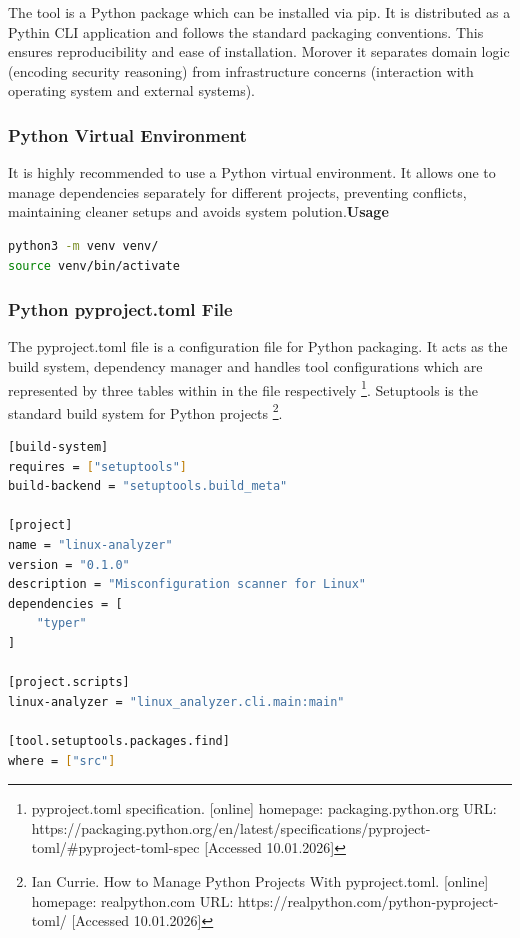 The tool is a Python package which can be installed via pip. It is distributed as a Pythin CLI application and follows the standard packaging conventions. This ensures reproducibility and ease of installation. Morover it separates domain logic (encoding security reasoning) from infrastructure concerns (interaction with operating system and external systems).

\newpage

\subsubsection{Python Virtual Environment}

It is highly recommended to use a Python virtual environment. It allows one to manage dependencies separately for different projects, preventing conflicts, maintaining cleaner setups and avoids system polution.\newline\newline \textbf{Usage} 
\begin{lstlisting}[language=Bash,caption={Creation and activation on command line}]
python3 -m venv venv/
source venv/bin/activate
\end{lstlisting}

\subsubsection{Python pyproject.toml File}

The pyproject.toml file is a configuration file for Python packaging. It acts as the build system, dependency manager and handles tool configurations which are represented by three tables within in the file respectively \footnote{pyproject.toml specification. [online] homepage: packaging.python.org URL: https://packaging.python.org/en/latest/specifications/pyproject-toml/\#pyproject-toml-spec [Accessed 10.01.2026]}. Setuptools is the standard build system for Python projects \footnote{Ian Currie. How to Manage Python Projects With pyproject.toml. [online] homepage: realpython.com URL: https://realpython.com/python-pyproject-toml/ [Accessed 10.01.2026]}.

\begin{lstlisting}[language=bash,caption={pyproject.toml file}]
[build-system]
requires = ["setuptools"]
build-backend = "setuptools.build_meta"

[project]
name = "linux-analyzer"
version = "0.1.0"
description = "Misconfiguration scanner for Linux"
dependencies = [
    "typer"
]

[project.scripts]
linux-analyzer = "linux_analyzer.cli.main:main"

[tool.setuptools.packages.find]
where = ["src"]
\end{lstlisting}

